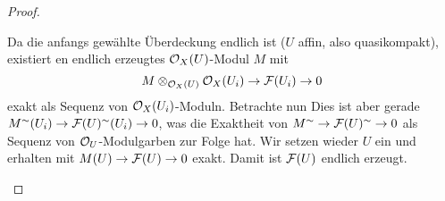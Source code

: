 \begin{proof}
\begin{description mathquote}
        Da die anfangs gewählte Überdeckung \obda endlich ist 
        ($U$ affin, also quasikompakt), existiert en endlich erzeugtes
        $\mathcal{O}_X(U)$-Modul $M$ mit
        \[ M\otimes_{\mathcal{O}_X(U)} \mathcal{O}_X(U_i) \to \mathcal{F}(U_i) \to 0\]
        exakt als Sequenz von $\mathcal{O}_X(U_i)$-Moduln. Betrachte nun 
        Dies ist aber gerade
        $M^\sim(U_i) \to \mathcal{F}(U)^\sim(U_i) \to 0$,
        was die Exaktheit von
        $M^\sim \to \mathcal{F}(U)^\sim \to 0$ als Sequenz von $\mathcal{O}_U$-Modulgarben
        zur Folge hat. Wir setzen wieder $U$ ein und erhalten mit
        $M(U) \to \mathcal{F}(U) \to 0$ exakt.
        Damit ist $\mathcal{F}(U)$ endlich erzeugt.
      \item[\text{(iii)}\Rightarrow\text{(i)}]
    \end{description mathquote}
\end{proof}


\pagebreak
